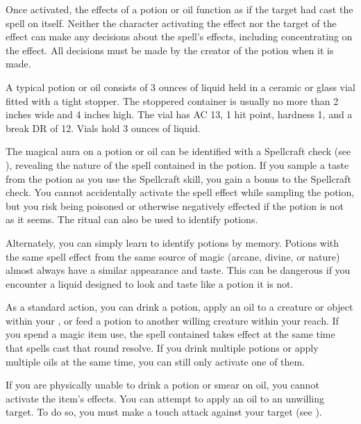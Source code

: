         Once activated, the effects of a potion or oil function as if the target had cast the spell on itself.
        Neither the character activating the effect nor the target of the effect can make any decisions about the spell's effects, including concentrating on the effect.
        All decisions must be made by the creator of the potion when it is made.

         A typical potion or oil consists of 3 ounces of liquid held in a ceramic or glass vial fitted with a tight stopper.
        The stoppered container is usually no more than 2 inches wide and 4 inches high.
        The vial has AC 13, 1 hit point, hardness 1, and a break DR of 12.
        Vials hold 3 ounces of liquid.

        The magical aura on a potion or oil can be identified with a Spellcraft check (see ), revealing the nature of the spell contained in the potion.
        If you sample a taste from the potion as you use the Spellcraft skill, you gain a  bonus to the Spellcraft check.
        You cannot accidentally activate the spell effect while sampling the potion, but you risk being poisoned or otherwise negatively effected if the potion is not as it seems.
        The  ritual can also be used to identify potions.

        Alternately, you can simply learn to identify potions by memory.
        Potions with the same spell effect from the same source of magic (arcane, divine, or nature) almost always have a similar appearance and taste.
        This can be dangerous if you encounter a liquid designed to look and taste like a potion it is not.

         As a standard action, you can drink a potion, apply an oil to a creature or object within your , or feed a potion to another willing creature within your reach.
        If you spend a magic item use, the spell contained takes effect at the same time that spells cast that round resolve.
        If you drink multiple potions or apply multiple oils at the same time, you can still only activate one of them.

        If you are physically unable to drink a potion or smear on oil, you cannot activate the item's effects.
        You can attempt to apply an oil to an unwilling target.
        To do so, you must make a touch attack against your target (see ).

